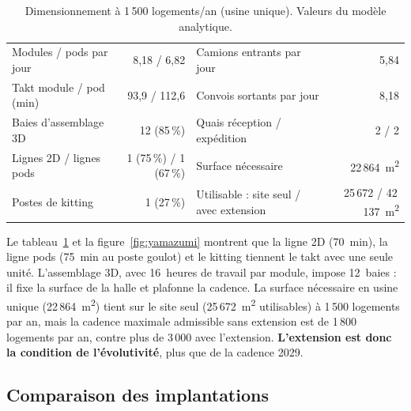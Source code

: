 \documentclass[11pt,a4paper]{article}
\newcommand{\mdeux}{m\textsuperscript{2}}
\begin{document}
\begin{table}[!htbp]
\centering\small
\caption{Dimensionnement à 1\,500 logements/an (usine unique). Valeurs du modèle analytique.}\label{tab:dim}
\begin{tabular}{@{}lr@{\hspace{2.5em}}lr@{}}
\toprule
Modules / pods par jour & 8,18 / 6,82 & Camions entrants par jour & 5,84 \\
Takt module / pod (min) & 93,9 / 112,6 & Convois sortants par jour & 8,18 \\
Baies d'assemblage 3D & 12 (85\,\%) & Quais réception / expédition & 2 / 2 \\
Lignes 2D / lignes pods & 1 (75\,\%) / 1 (67\,\%) & Surface nécessaire & 22\,864~\mdeux \\
Postes de kitting & 1 (27\,\%) & Utilisable : site seul / avec extension & 25\,672 / 42\,137~\mdeux \\
\bottomrule
\end{tabular}
\end{table}

Le tableau~\ref{tab:dim} et la figure~\ref{fig:yamazumi} montrent que la ligne 2D (70~min),
la ligne pods (75~min au poste goulot) et le kitting tiennent le takt avec une seule unité.
L'assemblage 3D, avec 16~heures de travail par module, impose 12~baies : il fixe la surface de la
halle et plafonne la cadence. La surface nécessaire en usine unique (22\,864~\mdeux) tient sur le
site seul (25\,672~\mdeux{} utilisables) à 1\,500 logements par an, mais la cadence maximale
admissible sans extension est de 1\,800 logements par an, contre plus de 3\,000 avec l'extension.
\textbf{L'extension est donc la condition de l'évolutivité}, plus que de la cadence 2029.

\subsection{Comparaison des implantations}
\end{document}
